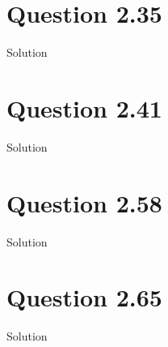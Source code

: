 \documentclass{article}
\begin{document}
\section*{Question 2.35}
\begin{center} Solution\end{center}


\section*{Question 2.41}
\begin{center} Solution\end{center}


\section*{Question 2.58}
\begin{center} Solution\end{center}


\section*{Question 2.65}
\begin{center} Solution\end{center}
\end{document}
